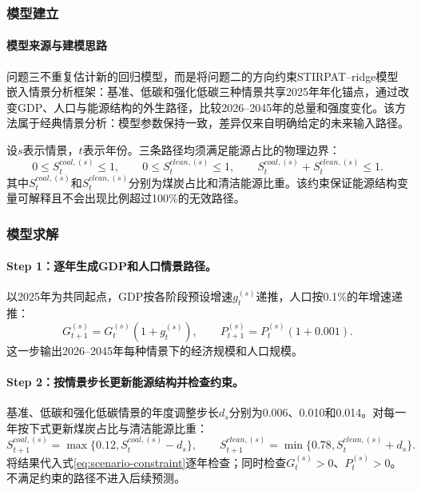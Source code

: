 \documentclass[12pt,a4paper]{ctexart}
\theoremstyle{definition}
\theoremstyle{plain}
\theoremstyle{remark}
\begin{document}
\subsubsection{模型建立}
\paragraph{模型来源与建模思路}
问题三不重复估计新的回归模型，而是将问题二的方向约束STIRPAT--ridge模型嵌入情景分析框架：基准、低碳和强化低碳三种情景共享2025年年化锚点，通过改变GDP、人口与能源结构的外生路径，比较2026--2045年的总量和强度变化。该方法属于经典情景分析：模型参数保持一致，差异仅来自明确给定的未来输入路径。

设$s$表示情景，$t$表示年份。三条路径均须满足能源占比的物理边界：
\begin{equation}
0\leq S_t^{coal,(s)}\leq1,\qquad0\leq S_t^{clean,(s)}\leq1,\qquad S_t^{coal,(s)}+S_t^{clean,(s)}\leq1.
\label{eq:scenario-constraint}
\end{equation}
其中$S_t^{coal,(s)}$和$S_t^{clean,(s)}$分别为煤炭占比和清洁能源比重。该约束保证能源结构变量可解释且不会出现比例超过100\%的无效路径。

\subsubsection{模型求解}
\paragraph{\textbf{Step 1：逐年生成GDP和人口情景路径。}}
以2025年为共同起点，GDP按各阶段预设增速$g_t^{(s)}$递推，人口按0.1\%的年增速递推：
\begin{equation}
G_{t+1}^{(s)}=G_t^{(s)}\left(1+g_t^{(s)}\right),\qquad P_{t+1}^{(s)}=P_t^{(s)}(1+0.001).
\label{eq:q3-gdp-pop}
\end{equation}
这一步输出2026--2045年每种情景下的经济规模和人口规模。

\paragraph{\textbf{Step 2：按情景步长更新能源结构并检查约束。}}
基准、低碳和强化低碳情景的年度调整步长$d_s$分别为0.006、0.010和0.014。对每一年按下式更新煤炭占比与清洁能源比重：
\begin{equation}
S_{t+1}^{coal,(s)}=\max\{0.12,S_t^{coal,(s)}-d_s\},\qquad S_{t+1}^{clean,(s)}=\min\{0.78,S_t^{clean,(s)}+d_s\}.
\label{eq:scenario-path}
\end{equation}
将结果代入式\eqref{eq:scenario-constraint}逐年检查；同时检查$G_t^{(s)}>0$、$P_t^{(s)}>0$。不满足约束的路径不进入后续预测。
\end{document}

